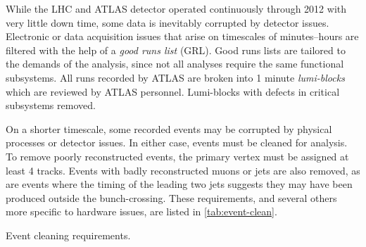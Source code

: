 While the LHC and ATLAS detector operated continuously through 2012 with very little down time, some data is inevitably corrupted by detector issues.
Electronic or data acquisition issues that arise on timescales of minutes--hours are filtered with the help of a \emph{good runs list} (GRL).
Good runs lists are tailored to the demands of the analysis, since not all analyses require the same functional subsystems.
All runs recorded by ATLAS are broken into 1 minute \emph{lumi-blocks} which are reviewed by ATLAS personnel.
Lumi-blocks with defects in critical subsystems removed.

On a shorter timescale, some recorded events may be corrupted by physical processes or detector issues. In either case, events must be cleaned for analysis. To remove poorly reconstructed events, the primary vertex must be assigned at least 4 tracks.
Events with badly reconstructed muons or jets are also removed, as are events where the timing of the leading two jets suggests they may have been produced outside the bunch-crossing.
These requirements, and several others more specific to hardware issues, are listed in \cref{tab:event-clean}.

\begin{table}
  \begin{center}
  
  \caption[Event cleaning requirements]{Event cleaning requirements. }
  \label{tab:event-clean}
  \end{center}
\end{table}
